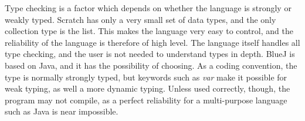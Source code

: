 Type checking is a factor which depends on whether the language is strongly or weakly typed. Scratch has only a very small set of data types, and the only collection type is the list. This makes the language very easy to control, and the reliability of the language is therefore of high level. The language itself handles all type checking, and the user is not needed to understand types in depth. BlueJ is based on Java, and it has the possibility of choosing. As a coding convention, the type is normally strongly typed, but keywords such as \emph{var} make it possible for weak typing, as well a more dynamic typing. Unless used correctly, though, the program may not compile, as a perfect reliability for a multi-purpose language such as Java is near impossible.